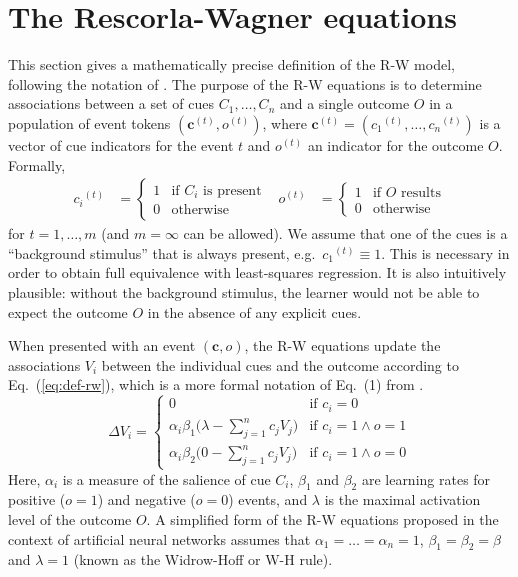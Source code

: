 \documentclass[conference]{IEEEtran}
\newcommand{\psup}[1]{\ensuremath{^{(#1)}}}
\newcommand{\psupt}{\psup{t}}
\begin{document}
\section{The Rescorla-Wagner equations}
\label{sec:math-def}

This section gives a mathematically precise definition of the R-W model, following the notation of \cite{danks2003}.  The purpose of the R-W equations is to determine associations between a set of cues $C_1, \ldots, C_n$ and a single outcome $O$ in a population of event tokens $(\mathbf{c}\psupt, o\psupt)$, where $\mathbf{c}\psupt = (c_1\psupt, \ldots, c_n\psupt)$ is a vector of cue indicators for the event $t$ and $o\psupt$ an indicator for the outcome $O$.  Formally,
\begin{align}
  \label{eq:def-c-o}
  c_i\psupt &= 
  \begin{cases}
    1 & \text{if $C_i$ is present} \\
    0 & \text{otherwise}
  \end{cases}
  &
  o\psupt &= 
  \begin{cases}
    1 & \text{if $O$ results} \\
    0 & \text{otherwise}
  \end{cases}
\end{align}
for $t = 1, \ldots, m$ (and $m = \infty$ can be allowed).  We assume that one of the cues is a ``background stimulus'' that is always present, e.g.\ $c_1\psupt \equiv 1$.  This is necessary in order to obtain full equivalence with least-squares regression.  It is also intuitively plausible: without the background stimulus, the learner would not be able to expect the outcome $O$ in the absence of any explicit cues. 

When presented with an event $(\mathbf{c}, o)$, the R-W equations update the associations $V_i$ between the individual cues and the outcome according to Eq.~(\ref{eq:def-rw}), which is a more formal notation of Eq.~(1) from \cite[p.\ 111]{danks2003}.
\begin{equation}
  \label{eq:def-rw}
  \Delta V_i =
  \begin{cases}
    0 & \text{if } c_i = 0\\
    \alpha_i \beta_1 \bigl(\lambda - \sum_{j=1}^n c_j V_j \bigr) & \text{if } c_i = 1 \wedge o = 1 \\
    \alpha_i \beta_2 \bigl(0 - \sum_{j=1}^n c_j V_j \bigr) & \text{if } c_i = 1 \wedge o = 0
  \end{cases}
\end{equation}
Here, $\alpha_i$ is a measure of the salience of cue $C_i$, $\beta_1$ and $\beta_2$ are learning rates for positive ($o=1$) and negative ($o=0$) events, and $\lambda$ is the maximal activation level of the outcome $O$.  A simplified form of the R-W equations proposed in the context of artificial neural networks \cite{widrowhoff1960} assumes that $\alpha_1 = \dots = \alpha_n = 1$,  $\beta_1 = \beta_2 = \beta$ and $\lambda = 1$ (known as the Widrow-Hoff or W-H rule).
\end{document}
